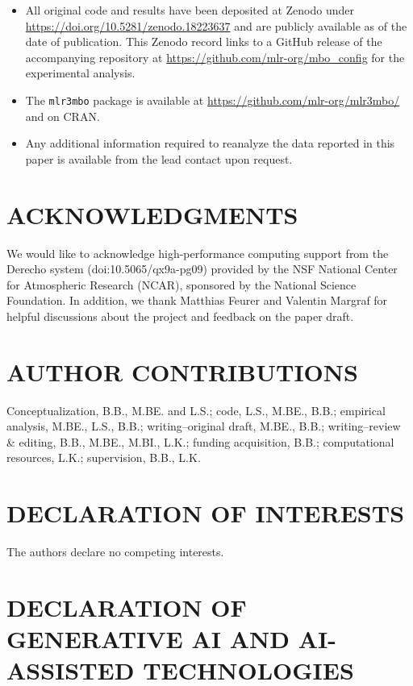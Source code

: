 \documentclass[12pt,letterpaper]{article}
\begin{document}
\begin{itemize}
  \item All original code and results have been deposited at Zenodo\cite{becker2026a} under \url{https://doi.org/10.5281/zenodo.18223637} and are publicly available as of the date of publication.
  This Zenodo record links to a GitHub release of the accompanying repository at \url{https://github.com/mlr-org/mbo_config} for the experimental analysis.
  \item The \texttt{mlr3mbo} package is available at \url{https://github.com/mlr-org/mlr3mbo/} and on CRAN.
  \item Any additional information required to reanalyze the data reported in this paper is available from the lead contact upon request.
\end{itemize}

\section*{ACKNOWLEDGMENTS}


We would like to acknowledge high-performance computing support from the Derecho system (doi:10.5065/qx9a-pg09) provided by the NSF National Center for Atmospheric Research (NCAR), sponsored by the National Science Foundation. In addition, we thank Matthias Feurer and Valentin Margraf for helpful discussions about the project and feedback on the paper draft.

\section*{AUTHOR CONTRIBUTIONS}


Conceptualization, B.B., M.BE. and L.S.; 
code, L.S., M.BE., B.B.; 
empirical analysis, M.BE., L.S., B.B.; 
writing--original draft, M.BE., B.B.;
writing--review \& editing, B.B., M.BE., M.BI., L.K.;
funding acquisition, B.B.; 
computational resources, L.K.;
supervision, B.B., L.K.

\section*{DECLARATION OF INTERESTS}


The authors declare no competing interests.

\section*{DECLARATION OF GENERATIVE AI AND AI-ASSISTED TECHNOLOGIES}
\end{document}
